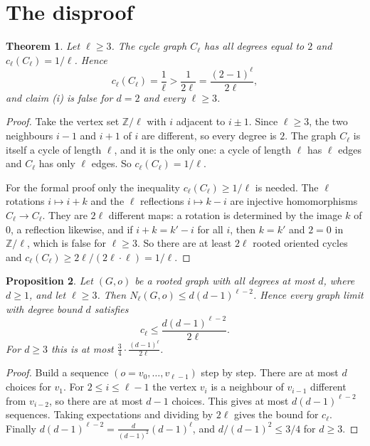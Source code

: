 \documentclass[11pt]{article}
\newtheorem{theorem}{Theorem}
\newtheorem{proposition}[theorem]{Proposition}
\theoremstyle{remark}
\begin{document}
\section*{The disproof}
\begin{theorem}\label{thm:cycle}
Let $\ell\ge3$. The cycle graph $C_\ell$ has all degrees equal to $2$
and $c_\ell(C_\ell)=1/\ell$. Hence
\[
 c_\ell(C_\ell)=\frac1\ell>\frac1{2\ell}=\frac{(2-1)^\ell}{2\ell},
\]
and claim (i) is false for $d=2$ and every $\ell\ge3$.
\end{theorem}
\begin{proof}
Take the vertex set $\mathbb Z/\ell$ with $i$ adjacent to $i\pm1$.
Since $\ell\ge3$, the two neighbours $i-1$ and $i+1$ of $i$ are
different, so every degree is $2$. The graph $C_\ell$ is itself a cycle
of length $\ell$, and it is the only one: a cycle of length $\ell$ has
$\ell$ edges and $C_\ell$ has only $\ell$ edges. So
$c_\ell(C_\ell)=1/\ell$.

For the formal proof only the inequality $c_\ell(C_\ell)\ge1/\ell$ is
needed. The $\ell$ rotations $i\mapsto i+k$ and the $\ell$ reflections
$i\mapsto k-i$ are injective homomorphisms $C_\ell\to C_\ell$. They are
$2\ell$ different maps: a rotation is determined by the image $k$ of
$0$, a reflection likewise, and if $i+k=k'-i$ for all $i$, then $k=k'$
and $2=0$ in $\mathbb Z/\ell$, which is false for $\ell\ge3$. So there
are at least $2\ell$ rooted oriented cycles and
$c_\ell(C_\ell)\ge 2\ell/(2\ell\cdot\ell)=1/\ell$.
\end{proof}

\begin{proposition}\label{prop:upper}
Let $(G,o)$ be a rooted graph with all degrees at most $d$, where
$d\ge1$, and let $\ell\ge3$. Then $N_\ell(G,o)\le d(d-1)^{\ell-2}$.
Hence every graph limit with degree bound $d$ satisfies
\[
 c_\ell\le\frac{d(d-1)^{\ell-2}}{2\ell}.
\]
For $d\ge3$ this is at most $\frac34\cdot\frac{(d-1)^\ell}{2\ell}$.
\end{proposition}
\begin{proof}
Build a sequence $(o=v_0,\dots,v_{\ell-1})$ step by step. There are at
most $d$ choices for $v_1$. For $2\le i\le\ell-1$ the vertex $v_i$ is a
neighbour of $v_{i-1}$ different from $v_{i-2}$, so there are at most
$d-1$ choices. This gives at most $d(d-1)^{\ell-2}$ sequences. Taking
expectations and dividing by $2\ell$ gives the bound for $c_\ell$.
Finally $d(d-1)^{\ell-2}=\frac{d}{(d-1)^2}(d-1)^\ell$, and
$d/(d-1)^2\le3/4$ for $d\ge3$.
\end{proof}
\end{document}
